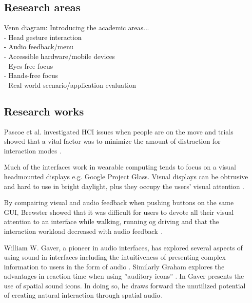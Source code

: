 \subsection{Research areas}
Venn diagram: Introducing the academic areas...\\
- Head gesture interaction\\
- Audio feedback/menu\\
- Accessible hardware/mobile devices\\
- Eyes-free focus\\
- Hands-free focus\\
- Real-world scenario/application evaluation

\subsection{Research works}

Pascoe et al. investigated HCI issues when people are on the move and trials showed that a vital factor was to minimize the amount of distraction for interaction modes \cite{pascoe_using_2000}.

Much of the interfaces work in wearable computing tends to focus on a visual headmounted displays \cite{barfield_fundamentals_2000} e.g. Google Project Glass. Visual displays can be obtrusive and hard to use in bright daylight, plus they occupy the users’ visual attention \cite{geelhoed_safety_2000}.

By compairing visual and audio feedback when pushing buttons on the same GUI, Brewster showed that it was difficult for users to devote all their visual attention to an interface while walking, running og driving and that the interaction workload decreased with audio feedback \cite{brewster_overcoming_2002}.

William W. Gaver, a pioneer in audio interfaces, has explored several aspects of using sound in interfaces including the intuitiveness of presenting complex information to users in the form of audio \cite{gaver_sonicfinder:_1989}. Similarly Graham explores the advantages in reaction time when using ”auditory icons” \cite{graham_use_1999}. In \cite{gaver_auditory_1986} Gaver presents the use of spatial sound icons. In doing so, he draws forward the unutilized potential of creating natural interaction through spatial audio.

